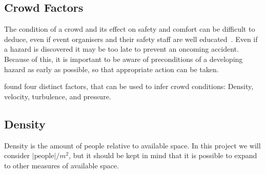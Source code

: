 




\subsection{Crowd Factors}

The condition of a crowd and its effect on safety and comfort can be difficult to deduce, even if event organisers and their safety staff are well educated~\cite{franke2015smart}. Even if a hazard is discovered it may be too late to prevent an oncoming accident. Because of this, it is important to be aware of preconditions of a developing hazard as early as possible, so that appropriate action can be taken.

\citet{wirz2012inferring} found four distinct factors, that can be used to infer crowd conditions: Density, velocity, turbulence, and pressure.

\subsection{Density}
Density is the amount of people relative to available space. In this project we will consider $|\text{people}| / m^2$, but it should be kept in mind that it is possible to expand to other measures of available space.

